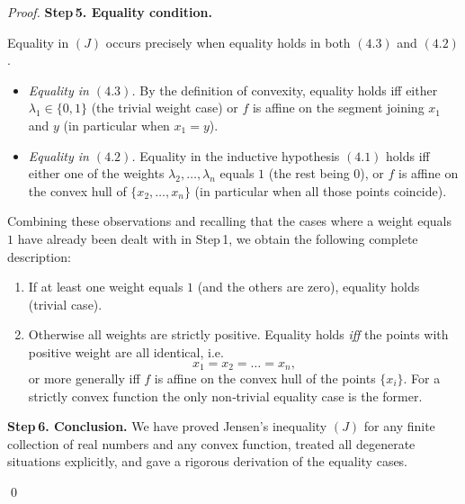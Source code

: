 \begin{proof}
\bigskip

\textbf{Step 5. Equality condition.}  

Equality in \((J)\) occurs precisely when equality holds in both \((4.3)\) and
\((4.2)\).

\begin{itemize}
\item \emph{Equality in \((4.3)\).}  
By the definition of convexity, equality holds iff either \(\lambda_{1}\in\{0,1\}\)
(the trivial weight case) or \(f\) is affine on the segment joining \(x_{1}\) and
\(y\) (in particular when \(x_{1}=y\)).

\item \emph{Equality in \((4.2)\).}  
Equality in the inductive hypothesis \((4.1)\) holds iff either one of the
weights \(\lambda_{2},\dots ,\lambda_{n}\) equals \(1\) (the rest being \(0\)),
or \(f\) is affine on the convex hull of \(\{x_{2},\dots ,x_{n}\}\) (in
particular when all those points coincide).
\end{itemize}

Combining these observations and recalling that the cases where a weight
equals \(1\) have already been dealt with in Step 1, we obtain the following
complete description:

\begin{enumerate}
\item If at least one weight equals \(1\) (and the others are zero), equality
holds (trivial case).
\item Otherwise all weights are strictly positive.  
Equality holds \emph{iff} the points with positive weight are all identical,
i.e.
\[
x_{1}=x_{2}= \dots =x_{n},
\]
or more generally iff \(f\) is affine on the convex hull of the points
\(\{x_{i}\}\). For a strictly convex function the only non‑trivial equality
case is the former.
\end{enumerate}

\bigskip

\textbf{Step 6. Conclusion.}  
We have proved Jensen’s inequality \((J)\) for any finite collection of real
numbers and any convex function, treated all degenerate situations explicitly,
and gave a rigorous derivation of the equality cases.

\qed
\end{proof}